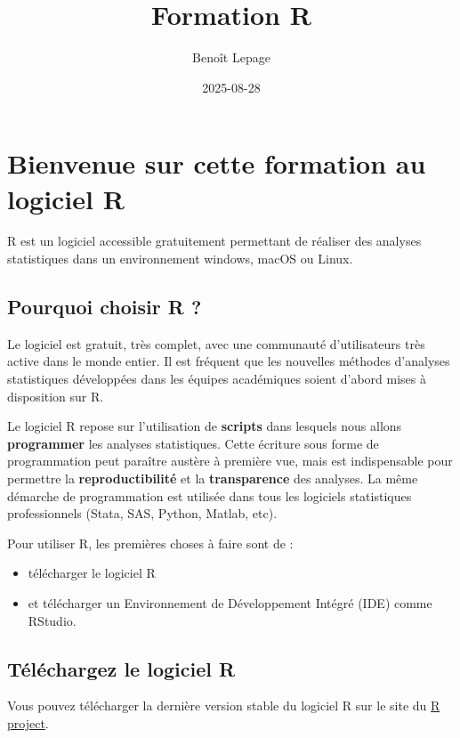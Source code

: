 \documentclass[
]{book}
\title{Formation R}
\author{Benoît Lepage}
\date{2025-08-28}
\providecommand{\tightlist}{%
  \setlength{\itemsep}{0pt}\setlength{\parskip}{0pt}}
\begin{document}
\maketitle

{
\setcounter{tocdepth}{1}
\tableofcontents
}
\chapter{Bienvenue sur cette formation au logiciel R}\label{bienvenue-sur-cette-formation-au-logiciel-r}

R est un logiciel accessible gratuitement permettant de réaliser des analyses statistiques dans un environnement windows, macOS ou Linux.

\section{Pourquoi choisir R ?}\label{pourquoi-choisir-r}

Le logiciel est gratuit, très complet, avec une communauté d'utilisateurs très active dans le monde entier. Il est fréquent que les nouvelles méthodes d'analyses statistiques développées dans les équipes académiques soient d'abord mises à disposition sur R.

Le logiciel R repose sur l'utilisation de \textbf{scripts} dans lesquels nous allons \textbf{programmer} les analyses statistiques. Cette écriture sous forme de programmation peut paraître austère à première vue, mais est indispensable pour permettre la \textbf{reproductibilité} et la \textbf{transparence} des analyses. La même démarche de programmation est utilisée dans tous les logiciels statistiques professionnels (Stata, SAS, Python, Matlab, etc).

Pour utiliser R, les premières choses à faire sont de :

\begin{itemize}
\tightlist
\item
  télécharger le logiciel R
\item
  et télécharger un Environnement de Développement Intégré (IDE) comme RStudio.
\end{itemize}

\section{Téléchargez le logiciel R}\label{tuxe9luxe9chargez-le-logiciel-r}

Vous pouvez télécharger la dernière version stable du logiciel R sur le site du \href{https://www.r-project.org/}{R project}.
\end{document}
